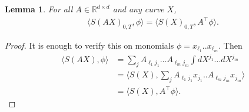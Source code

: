 \documentclass{scrartcl}
\theoremstyle{plain}
\newtheorem{lemma}[theorem]{Lemma}
\theoremstyle{definition}
\newcommand{\R}{\mathbb{R}}
\newcommand{\1}[1]{1_{\{#1\}}}
\newcommand{\ds}{d} %
\begin{document}
\begin{lemma}
  For all $A \in \R^{\ds \times \ds}$ and any curve $X$,
  \begin{align*}
    \Big\langle S(A X)_{0,T}, \phi \Big\rangle
    =
    \Big\langle S(X)_{0,T}, A^\top \phi \Big\rangle.
  \end{align*}
\end{lemma}
\begin{proof}
  It is enough to verify this on monomials $\phi = x_{\ell_1} .. x_{\ell_m}$.
  Then
  \begin{align*}
    \Big\langle S( A X ), \phi \Big\rangle
    &=
    \sum_j A_{\ell_1 j_1} \dots A_{\ell_m j_m} \int d X^{j_1} \dots d  X^{j_m} \\
    &=
    \Big\langle S(X), \sum_j A_{\ell_1 j_1} x_{j_1} .. A_{\ell_m j_m} x_{j_m} \Big\rangle \\
    &=
    \Big\langle S(X), A^\top \phi \Big\rangle.
  \end{align*}
\end{proof}
\end{document}
